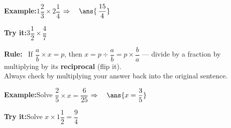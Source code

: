 \documentclass[12pt]{article}
\begin{document}
\begin{examplebox}
\textbf{Example:}\quad $1\dfrac{2}{3} \times 2\dfrac{1}{4}$
$\Rightarrow\quad \ans{\,\dfrac{15}{4}}$
\end{examplebox}

\begin{tryitbox}
\textbf{Try it:}\quad $3\dfrac{1}{2} \times \dfrac{4}{7}$\\[2pt]
\end{tryitbox}


\begin{formulabox}
\textbf{Rule:} \ If $\dfrac{a}{b} \times x = p$, then
$x = p \div \dfrac{a}{b} = p \times \dfrac{b}{a}$ --- divide by a fraction by
multiplying by its \textbf{reciprocal} (flip it).\\[3pt]
Always check by multiplying your answer back into the original sentence.
\end{formulabox}

\begin{examplebox}
\textbf{Example:}\quad Solve $\dfrac{2}{5} \times x = \dfrac{6}{25}$
$\Rightarrow\quad \ans{x = \dfrac{3}{5}}$
\end{examplebox}

\begin{tryitbox}
\textbf{Try it:}\quad Solve $x \times 1\dfrac{1}{2} = \dfrac{9}{4}$\\[2pt]
\end{tryitbox}
\end{document}
